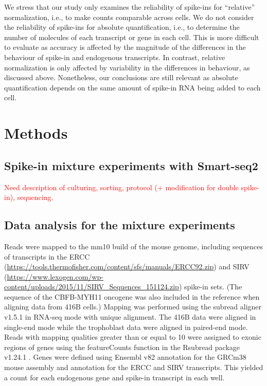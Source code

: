 \documentclass{article}
\begin{document}
We stress that our study only examines the reliability of spike-ins for ``relative'' normalization, i.e., to make counts comparable across cells.
We do not consider the reliability of spike-ins for absolute quantification, i.e., to determine the number of molecules of each transcript or gene in each cell.
This is more difficult to evaluate as accuracy is affected by the magnitude of the differences in the behaviour of spike-in and endogenous transcripts.
In contrast, relative normalization is only affected by variability in the differences in behaviour, as discussed above.
Nonetheless, our conclusions are still relevant as absolute quantification depends on the same amount of spike-in RNA being added to each cell.


\section{Methods}

\subsection{Spike-in mixture experiments with Smart-seq2}

\textcolor{red}{Need description of culturing, sorting, protocol (+ modification for double spike-in), sequencing.}

\subsection{Data analysis for the mixture experiments}
Reads were mapped to the mm10 build of the mouse genome, including sequences of transcripts in the ERCC (\url{https://tools.thermofisher.com/content/sfs/manuals/ERCC92.zip}) and SIRV (\url{https://www.lexogen.com/wp-content/uploads/2015/11/SIRV_Sequences_151124.zip}) spike-in sets.
(The sequence of the CBFB-MYH11 oncogene was also included in the reference when aligning data from 416B cells.)
Mapping was performed using the subread aligner v1.5.1 \cite{liao2013subread} in RNA-seq mode with unique alignment.
The 416B data were aligned in single-end mode while the trophoblast data were aligned in paired-end mode.
Reads with mapping qualities greater than or equal to 10 were assigned to exonic regions of genes using the featureCounts function in the Rsubread package v1.24.1 \cite{liao2014featurecounts}.
Genes were defined using Ensembl v82 annotation for the GRCm38 mouse assembly and annotation for the ERCC and SIRV transcripts.
This yielded a count for each endogenous gene and spike-in transcript in each well.
\end{document}

